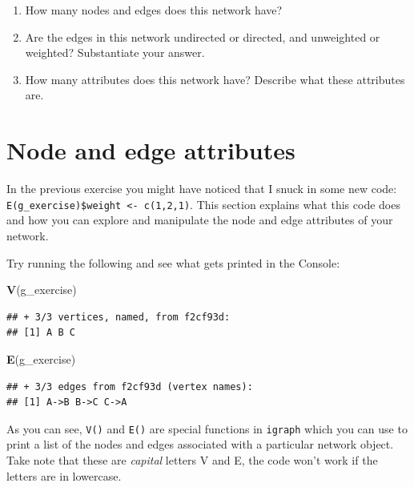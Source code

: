 \documentclass[
]{book}
\newenvironment{Shaded}{\begin{snugshade}}{\end{snugshade}}
\newcommand{\FunctionTok}[1]{\textcolor[rgb]{0.13,0.29,0.53}{\textbf{#1}}}
\newcommand{\NormalTok}[1]{#1}
\providecommand{\tightlist}{%
  \setlength{\itemsep}{0pt}\setlength{\parskip}{0pt}}
\begin{document}
\begin{enumerate}
\def\labelenumi{\arabic{enumi}.}
\tightlist
\item
  How many nodes and edges does this network have?
\item
  Are the edges in this network undirected or directed, and unweighted or weighted? Substantiate your answer.
\item
  How many attributes does this network have? Describe what these attributes are.
\end{enumerate}

\section{Node and edge attributes}\label{node-and-edge-attributes}

In the previous exercise you might have noticed that I snuck in some new code: \texttt{E(g\_exercise)\$weight\ \textless{}-\ c(1,2,1)}. This section explains what this code does and how you can explore and manipulate the node and edge attributes of your network.

Try running the following and see what gets printed in the Console:

\begin{Shaded}
\begin{Highlighting}[]
\FunctionTok{V}\NormalTok{(g\_exercise)}
\end{Highlighting}
\end{Shaded}

\begin{verbatim}
## + 3/3 vertices, named, from f2cf93d:
## [1] A B C
\end{verbatim}

\begin{Shaded}
\begin{Highlighting}[]
\FunctionTok{E}\NormalTok{(g\_exercise)}
\end{Highlighting}
\end{Shaded}

\begin{verbatim}
## + 3/3 edges from f2cf93d (vertex names):
## [1] A->B B->C C->A
\end{verbatim}

As you can see, \texttt{V()} and \texttt{E()} are special functions in \texttt{igraph} which you can use to print a list of the nodes and edges associated with a particular network object. Take note that these are \emph{capital} letters V and E, the code won't work if the letters are in lowercase.
\end{document}

